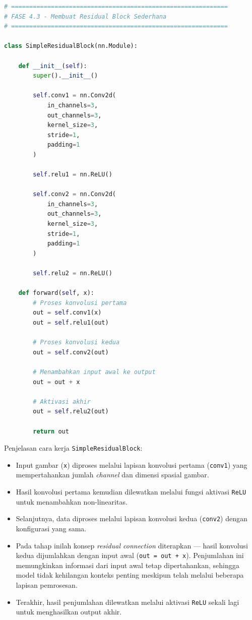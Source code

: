 \begin{lstlisting}[language=Python, caption=Membuat SimpleResidualBlock]
# ============================================================
# FASE 4.3 - Membuat Residual Block Sederhana
# ============================================================

class SimpleResidualBlock(nn.Module):

    def __init__(self):
        super().__init__()

        self.conv1 = nn.Conv2d(
            in_channels=3,
            out_channels=3,
            kernel_size=3,
            stride=1,
            padding=1
        )

        self.relu1 = nn.ReLU()

        self.conv2 = nn.Conv2d(
            in_channels=3,
            out_channels=3,
            kernel_size=3,
            stride=1,
            padding=1
        )

        self.relu2 = nn.ReLU()

    def forward(self, x):
        # Proses konvolusi pertama
        out = self.conv1(x)
        out = self.relu1(out)

        # Proses konvolusi kedua
        out = self.conv2(out)

        # Menambahkan input awal ke output
        out = out + x

        # Aktivasi akhir
        out = self.relu2(out)

        return out
\end{lstlisting}

Penjelasan cara kerja \texttt{SimpleResidualBlock}:

\begin{itemize}
    \item Input gambar (\texttt{x}) diproses melalui lapisan konvolusi pertama (\texttt{conv1}) yang mempertahankan jumlah \textit{channel} dan dimensi spasial gambar.
    \item Hasil konvolusi pertama kemudian dilewatkan melalui fungsi aktivasi \texttt{ReLU} untuk menambahkan non-linearitas.
    \item Selanjutnya, data diproses melalui lapisan konvolusi kedua (\texttt{conv2}) dengan konfigurasi yang sama.
    \item Pada tahap inilah konsep \textit{residual connection} diterapkan --- hasil konvolusi kedua dijumlahkan dengan input awal (\texttt{out = out + x}). Penjumlahan ini memungkinkan informasi dari input awal tetap dipertahankan, sehingga model tidak kehilangan konteks penting meskipun telah melalui beberapa lapisan pemrosesan.
    \item Terakhir, hasil penjumlahan dilewatkan melalui aktivasi \texttt{ReLU} sekali lagi untuk menghasilkan output akhir.
\end{itemize}

